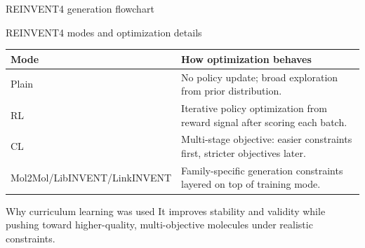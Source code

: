 \documentclass[aspectratio=169,10pt]{beamer}
\begin{document}
\begin{frame}{REINVENT4 generation flowchart}
  \begin{center}
  \end{center}
\end{frame}

\begin{frame}{REINVENT4 modes and optimization details}
  \small
  \begin{tabularx}{\textwidth}{lX}
    \toprule
    \textbf{Mode} & \textbf{How optimization behaves} \\
    \midrule
    Plain & No policy update; broad exploration from prior distribution. \\
    RL & Iterative policy optimization from reward signal after scoring each batch. \\
    CL & Multi-stage objective: easier constraints first, stricter objectives later. \\
    Mol2Mol/LibINVENT/LinkINVENT & Family-specific generation constraints layered on top of training mode. \\
    \bottomrule
  \end{tabularx}

  \vspace{4pt}
  \begin{alertblock}{Why curriculum learning was used}
    It improves stability and validity while pushing toward higher-quality,
    multi-objective molecules under realistic constraints.
  \end{alertblock}
\end{frame}
\end{document}
